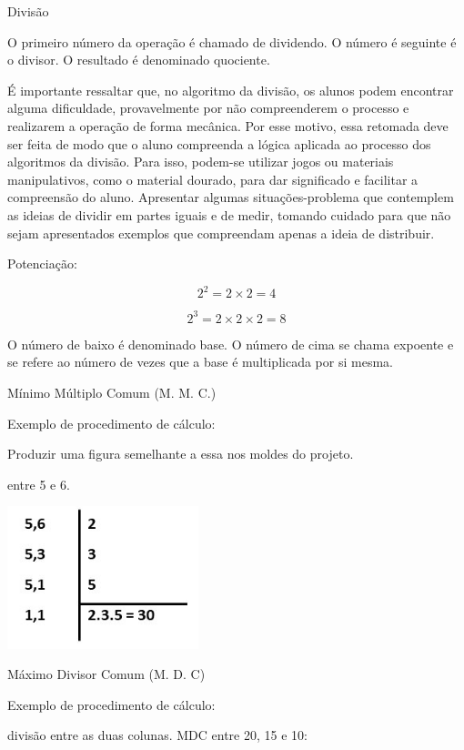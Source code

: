 Divisão


O primeiro número da operação é chamado de dividendo. O número é
seguinte é o divisor. O resultado é denominado quociente.

É importante ressaltar que, no algoritmo da divisão, os alunos podem
encontrar alguma dificuldade, provavelmente por não compreenderem o
processo e realizarem a operação de forma mecânica. Por esse motivo,
essa retomada deve ser feita de modo que o aluno compreenda a lógica
aplicada ao processo dos algoritmos da divisão. Para isso, podem-se
utilizar jogos ou materiais manipulativos, como o material dourado, para
dar significado e facilitar a compreensão do aluno. Apresentar algumas
situações-problema que contemplem as ideias de dividir em partes iguais
e de medir, tomando cuidado para que não sejam apresentados exemplos que
compreendam apenas a ideia de distribuir.

Potenciação:

$$2^2 = 2 \times 2 = 4$$ 

$$2^3 = 2 \times 2 \times 2 = 8$$

O número de baixo é denominado base. O número de cima se chama expoente
e se refere ao número de vezes que a base é multiplicada por si mesma.

Mínimo Múltiplo Comum (M. M. C.)

Exemplo de procedimento de cálculo:

Produzir uma figura semelhante a essa nos moldes do projeto.

entre 5 e 6.

\includegraphics[width=2.18605in,height=1.62945in]{./imgSAEB_6_MAT/media/image21.jpeg}

Máximo Divisor Comum (M. D. C)

Exemplo de procedimento de cálculo:

divisão entre as duas colunas. MDC entre 20, 15 e 10:

